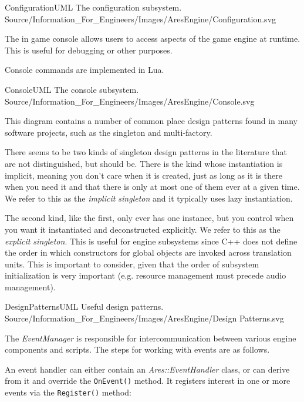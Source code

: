 \FullPageLandscapeDiagram
    {ConfigurationUML}
    {The configuration subsystem.}
    {Source/Information_For_Engineers/Images/AresEngine/Configuration.svg}

\page
{}
The in game console allows users to access aspects of the game engine at runtime. This is useful for debugging or other purposes.

Console commands are implemented in Lua.

\FullPageLandscapeDiagram
    {ConsoleUML}
    {The console subsystem.}
    {Source/Information_For_Engineers/Images/AresEngine/Console.svg}

\page
{}
This diagram contains a number of common place design patterns found in many software projects, such as the singleton and multi-factory. 

There seems to be two kinds of singleton design patterns in the literature that are not distinguished, but should be. There is the kind whose instantiation is implicit, meaning you don't care when it is created, just as long as it is there when you need it and that there is only at most one of them ever at a given time. We refer to this as the {\it implicit singleton} and it typically uses lazy instantiation.

The second kind, like the first, only ever has one instance, but you control when you want it instantiated and deconstructed explicitly. We refer to this as the {\it explicit singleton}. This is useful for engine subsystems since C++ does not define the order in which constructors for global objects are invoked across translation units. This is important to consider, given that the order of subsystem initialization is very important (e.g. resource management must precede audio management).

\FullPageLandscapeDiagram
    {DesignPatternsUML}
    {Useful design patterns.}
    {Source/Information_For_Engineers/Images/AresEngine/Design Patterns.svg}

\page 
{}
The {\it EventManager} is responsible for intercommunication between various engine components and scripts. The steps for working with events are as follows.

An event handler can either contain an {\it Ares::EventHandler} class, or can derive from it and override the {\tt OnEvent()} method. It registers interest in one or more events via the {\tt Register()} method:

